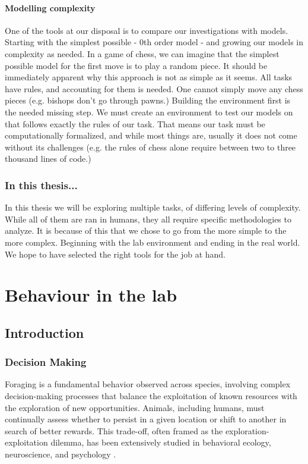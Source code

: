 \documentclass[11pt]{article}
\begin{document}
\paragraph{Modelling complexity}
One of the tools at our disposal is to compare our investigations with models. Starting with the simplest possible - 0th order model - and growing our models in complexity as needed. In a game of chess, we can imagine that the simplest possible model for the first move is to play a random piece. It should be immediately apparent why this approach is not as simple as it seems. All tasks have rules, and accounting for them is needed. One cannot simply move any chess pieces (e.g. bishops don't go through pawns.)
Building the environment first is the needed missing step. We must create an environment to test our models on that follows exactly the rules of our task.
That means our task must be computationally formalized, and while most things are, usually it does not come without its challenges (e.g. the rules of chess alone require between two to three thousand lines of code.)

\subsubsection{In this thesis...}
In this thesis we will be exploring multiple tasks, of differing levels of complexity. While all of them are ran in humans, they all require specific methodologies to analyze. It is because of this that we chose to go from the more simple to the more complex. Beginning with the lab environment and ending in the real world. We hope to have selected the right tools for the job at hand.

\clearpage

\section{Behaviour in the lab}
\subsection{Introduction}
\subsubsection{Decision Making}

Foraging is a fundamental behavior observed across species, involving complex decision-making processes that balance the exploitation of known resources with the exploration of new opportunities. Animals, including humans, must continually assess whether to persist in a given location or shift to another in search of better rewards. This trade-off, often framed as the exploration-exploitation dilemma, has been extensively studied in behavioral ecology, neuroscience, and psychology \cite{cohen2007should, hills2015exploration}.
\end{document}
